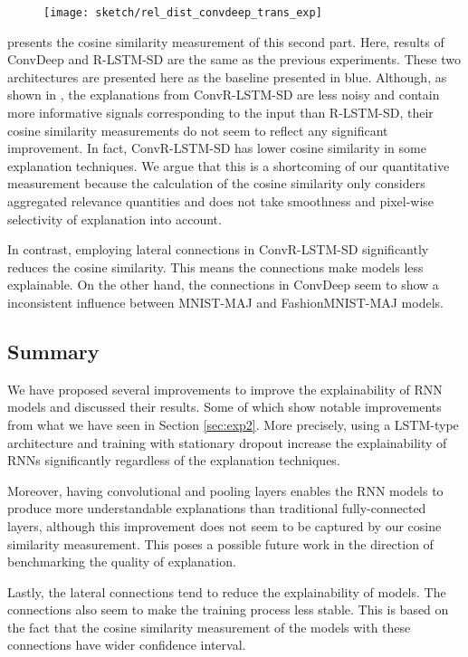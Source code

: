  \begin{figure}[!htb]
\centering
\texttt{[image: sketch/rel\_dist\_convdeep\_trans\_exp]}
\label{fig:rel_dist_convdeep_trans_exp}
\end{figure}

\addfigure{\ref{fig:rel_dist_convdeep_trans_exp}} presents the cosine similarity measurement of this second part. Here, results of ConvDeep and R-LSTM-SD are the same as the previous experiments. These two architectures are presented here as the baseline presented in blue.  Although,  as shown in \addfigure{\ref{fig:heatmap_msc_convrlstm_pos_rel}}, the explanations from ConvR-LSTM-SD are less noisy and contain more informative signals corresponding to the input than R-LSTM-SD, their cosine similarity measurements do not seem to reflect any significant improvement. In fact,  ConvR-LSTM-SD has lower cosine similarity in some explanation techniques. We argue that this is a shortcoming of our quantitative measurement because the calculation of the cosine similarity only considers aggregated relevance quantities and does not take smoothness and pixel-wise selectivity of explanation into account. 

In contrast, employing lateral connections in ConvR-LSTM-SD significantly reduces the cosine similarity. This means the connections make models less explainable. On the other hand, the connections in ConvDeep  seem to show a inconsistent influence between MNIST-MAJ and FashionMNIST-MAJ models. 


\subsection{Summary}
We have proposed several improvements to improve the explainability of RNN models and discussed their results.  Some of which show notable improvements from what we have seen in Section \ref{sec:exp2}. More precisely, using a LSTM-type architecture and training with stationary dropout increase the explainability of RNNs significantly regardless of the explanation techniques.

Moreover, having convolutional and pooling layers enables the RNN models to produce more understandable explanations than traditional fully-connected layers, although this improvement does not seem to be  captured by our cosine similarity measurement. This poses a possible future work in the direction of benchmarking the quality of explanation.

Lastly, the lateral connections tend to reduce the explainability of models. The connections also seem to make the training process less stable. This is based on the fact that the cosine similarity measurement of the models with these connections have wider confidence interval.